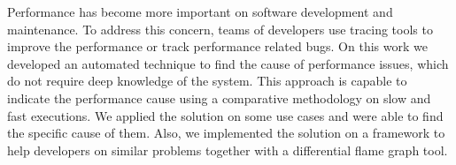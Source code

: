 Performance has become more important on software development and maintenance. To address this concern, teams of developers use tracing tools to improve the performance or track performance related bugs. On this work we developed an automated technique to find the cause of performance issues, which do not require deep knowledge of the system. This approach is capable to indicate the performance cause using a comparative methodology on slow and fast executions. We applied the solution on some use cases and were able to find the specific cause of them. Also, we implemented the solution on a framework to help developers on similar problems together with a differential flame graph tool.